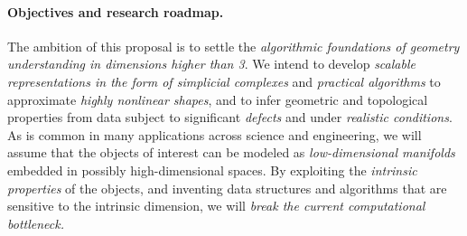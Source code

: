 \paragraph{Objectives and research roadmap.}
The ambition of this proposal is to settle the {\em algorithmic
foundations of geometry understanding in dimensions higher than
3}.  We intend to develop {\em scalable representations in the form of simplicial complexes} and {\em
practical algorithms} to approximate {\em highly nonlinear shapes}, and to
infer geometric and topological properties from data subject to
significant {\em defects} and under {\em realistic conditions}.
As is common in many applications across science and engineering, we
will assume that the objects of interest can be modeled as {\em
  low-dimensional manifolds} embedded in possibly high-dimensional
spaces. By exploiting the {\em intrinsic properties} of the objects,
and  inventing data structures and algorithms
that are sensitive to the intrinsic dimension, we will {\em break the current computational
bottleneck.}  %

